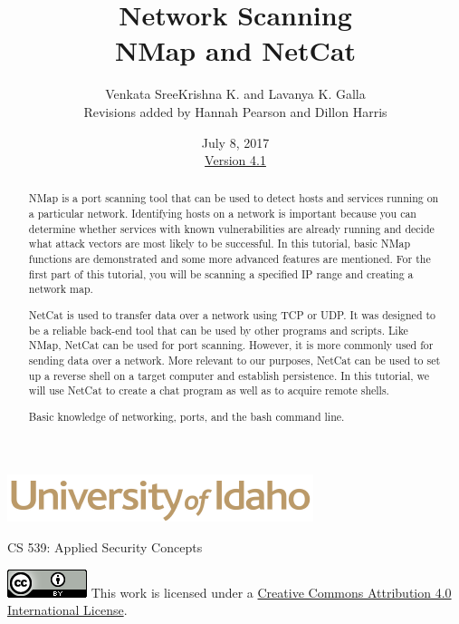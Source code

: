 \documentclass[12pt]{article}
\begin{document}
\title{ Network Scanning \\ \large  NMap and NetCat}
\author{Venkata SreeKrishna K. and Lavanya K. Galla \\ Revisions added by Hannah Pearson and Dillon Harris}
\date{July 8, 2017 \\ \hyperref[changelog]{Version 4.1}} %
\renewcommand{\abstractname}{Executive Summary}
\begin{titlepage}
\maketitle
\keepthetitle %
\begin{center}
\includegraphics[scale=.5]{UofI}

\large{CS 539: Applied Security Concepts}

\vskip 40pt

\end{center}
\begin{abstract}
NMap is a port scanning tool that can be used to detect hosts and services running on a particular network. Identifying hosts on a network is important because you can determine whether services with known vulnerabilities are already running and decide what attack vectors are most likely to be successful. In this tutorial, basic NMap functions are demonstrated and some more advanced features are mentioned. For the first part of this tutorial, you will be scanning a specified IP range and creating a network map. 

NetCat is used to transfer data over a network using TCP or UDP. It was designed to be a reliable back-end tool that can be used by other programs and scripts. Like NMap, NetCat can be used for port scanning. However, it is more commonly used for sending data over a network. More relevant to our purposes, NetCat can be used to set up a reverse shell on a target computer and establish persistence. In this tutorial, we will use NetCat to create a chat program as well as to acquire remote shells.


Basic knowledge of networking, ports, and the bash command line.
\end{abstract}


\vfill
\begin{center}
	\includegraphics[scale=0.5]{cc}
	\vskip 10pt
	This work is licensed under a \href{https://creativecommons.org/licenses/by/4.0/}{Creative Commons Attribution 4.0 International License}.
\end{center}

\end{titlepage}
\end{document}
